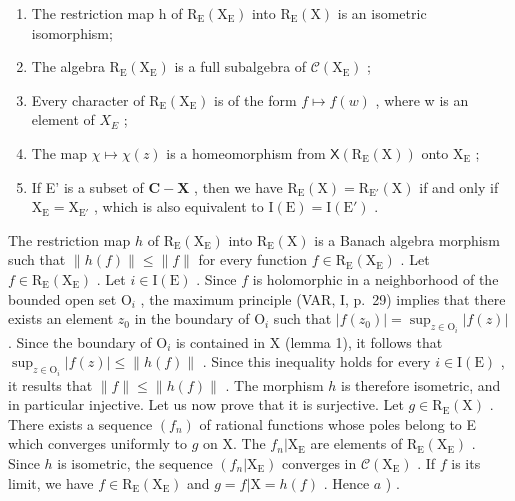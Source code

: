 \begin{enumerate}
\def\labelenumi{\alph{enumi})}
\item
  The restriction map h of \(\mathrm{R}_{\mathrm{E}}(\mathrm{X}_{\mathrm{E}})\) into \(\mathrm{R}_{\mathrm{E}}(\mathrm{X})\) is an isometric isomorphism;
\item
  The algebra \(\mathrm{R}_{\mathrm{E}}(\mathrm{X}_{\mathrm{E}})\) is a full subalgebra of \(\mathcal{C}(\mathrm{X}_{\mathrm{E}})\) ;
\item
  Every character of \(\mathrm{R}_{\mathrm{E}}(\mathrm{X}_{\mathrm{E}})\) is of the form \(f \mapsto f(w)\) , where w is an element of \(X_{E}\) ;
\item
  The map \(\chi \mapsto \chi (z)\) is a homeomorphism from \(\mathsf{X}(\mathrm{R}_{\mathrm{E}}(\mathrm{X}))\) onto \(\mathrm{X}_{\mathrm{E}}\) ;
\item
  If E' is a subset of \(\mathbf{C} - \mathbf{X}\) , then we have \(\mathrm{R}_{\mathrm{E}}(\mathrm{X}) = \mathrm{R}_{\mathrm{E}'}(\mathrm{X})\) if and only if \(\mathrm{X}_{\mathrm{E}} = \mathrm{X}_{\mathrm{E}'}\) , which is also equivalent to \(\mathrm{I}(\mathrm{E}) = \mathrm{I}(\mathrm{E}')\) .
\end{enumerate}

The restriction map \(h\) of \(\mathrm{R}_{\mathrm{E}}(\mathrm{X}_{\mathrm{E}})\) into \(\mathrm{R}_{\mathrm{E}}(\mathrm{X})\) is a Banach algebra morphism such that \(\| h(f)\| \leqslant \| f\|\) for every function \(f\in \mathrm{R}_{\mathrm{E}}(\mathrm{X}_{\mathrm{E}})\) . Let \(f\in \mathrm{R}_{\mathrm{E}}(\mathrm{X}_{\mathrm{E}})\) . Let \(i\in \mathrm{I}(\mathrm{E})\) . Since \(f\) is holomorphic in a neighborhood of the bounded open set \(\mathrm{O}_i\) , the maximum principle (VAR, I, p.~29) implies that there exists an element \(z_0\) in the boundary of \(\mathrm{O}_i\) such that \(|f(z_0)| = \sup_{z\in \mathrm{O}_i}|f(z)|\) . Since the boundary of \(\mathrm{O}_i\) is contained in X (lemma 1), it follows that \(\sup_{z\in \mathrm{O}_i}|f(z)|\leqslant \| h(f)\|\) . Since this inequality holds for every \(i\in \mathrm{I}(\mathrm{E})\) , it results that \(\| f\| \leqslant \| h(f)\|\) . The morphism \(h\) is therefore isometric, and in particular injective. Let us now prove that it is surjective. Let \(g\in \mathrm{R}_{\mathrm{E}}(\mathrm{X})\) . There exists a sequence \((f_n)\) of rational functions whose poles belong to E which converges uniformly to \(g\) on X. The \(f_n|\mathrm{X}_{\mathrm{E}}\) are elements of \(\mathrm{R}_{\mathrm{E}}(\mathrm{X}_{\mathrm{E}})\) . Since \(h\) is isometric, the sequence \((f_n|\mathrm{X}_{\mathrm{E}})\) converges in \(\mathcal{C}(\mathrm{X}_{\mathrm{E}})\) . If \(f\) is its limit, we have \(f\in \mathrm{R}_{\mathrm{E}}(\mathrm{X}_{\mathrm{E}})\) and \(g = f|\mathrm{X} = h(f)\) . Hence \(a\) ) .

